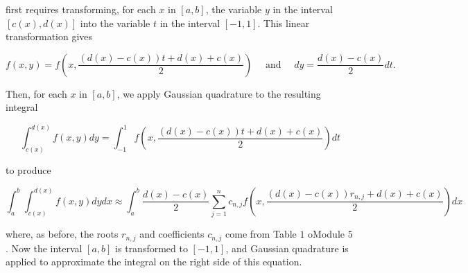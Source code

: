 first requires transforming, for each $x$ in $[a, b]$, the variable $y$ in the interval $[c(x), d(x)]$ into the variable $t$ in the interval $[-1,1]$. This linear transformation gives

$$
f(x, y)=f\left(x, \frac{(d(x)-c(x)) t+d(x)+c(x)}{2}\right) \quad \text { and } \quad d y=\frac{d(x)-c(x)}{2} d t .
$$

Then, for each $x$ in $[a, b]$, we apply Gaussian quadrature to the resulting integral

$$
\int_{c(x)}^{d(x)} f(x, y) d y=\int_{-1}^{1} f\left(x, \frac{(d(x)-c(x)) t+d(x)+c(x)}{2}\right) d t
$$

to produce

$$
\int_{a}^{b} \int_{c(x)}^{d(x)} f(x, y) d y d x \approx \int_{a}^{b} \frac{d(x)-c(x)}{2} \sum_{j=1}^{n} c_{n, j} f\left(x, \frac{(d(x)-c(x)) r_{n, j}+d(x)+c(x)}{2}\right) d x
$$

where, as before, the roots $r_{n, j}$ and coefficients $c_{n, j}$ come from Table $1$ oModule $5$. Now the interval $[a, b]$ is transformed to $[-1,1]$, and Gaussian quadrature is applied to approximate the integral on the right side of this equation. 

